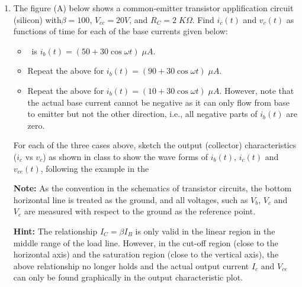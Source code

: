 \begin{enumerate}
\item The figure (A) below shows a common-emitter transistor 
applification circuit (silicon) with$\beta=100$, $V_{cc}=20V$, 
and $R_C=2\;K\Omega$. Find $i_c(t)$ and $v_c(t)$ as functions of time for each
  of the base currents given below:
\begin{itemize}

\item 
\
 is $i_b(t)=(50+30 \cos \omega t)\;\mu A$.

\item Repeat the above for $i_b(t)=(90+30 \cos \omega t)\;\mu A$.
\item Repeat the above for $i_b(t)=(10+30 \cos \omega t)\;\mu A$.
  However, note that the actual base current cannot be negative as 
  it can only flow from base to emitter but not the other direction,
  i.e., all negative parts of $i_b(t)$ are zero.
\end{itemize}
For each of the three cases above, sketch the output (collector) 
characteristics ($i_c$ vs $v_c$) as shown in class to show the wave
forms of $i_b(t)$, $i_c(t)$ and $v_{ce}(t)$, following the example
in the 

{\bf Note:} As the convention in the schematics of transistor circuits,
the bottom horizontal line is treated as the ground, and all voltages,
such as $V_b$, $V_c$ and $V_e$ are measured with respect to the 
ground as the reference point.

{\bf Hint:} The relationship $I_C=\beta I_B$ is only valid in the
linear region in the middle range of the load line. However, in 
the cut-off region (close to the horizontal axis) and the saturation
region (close to the vertical axis), the above relationship no
longer holds and the actual output current $I_c$ and $V_{ce}$ can
only be found graphically in the output characteristic plot.






\end{enumerate}
